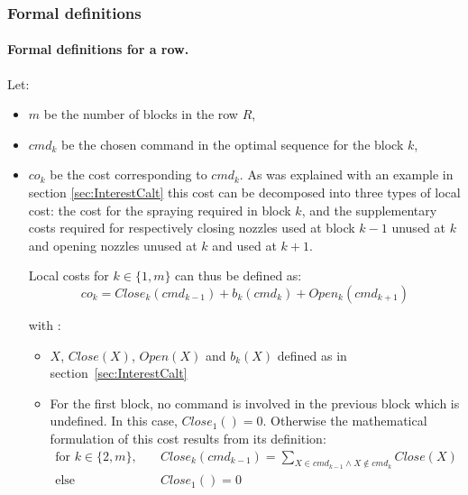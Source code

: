 \subsubsection{Formal definitions}

\paragraph{\textbf{Formal definitions for a row.}} 
Let:
\begin{itemize}
\item $m$ be the number of blocks in the row $R$,
\item $cmd_k$ be the chosen command in the optimal sequence for the block $k$,
\item $co_k$ be the cost corresponding to $cmd_k$. 
As was explained with an example in section \ref{sec:InterestCalt} %
this cost can be decomposed into three types of local cost: the cost for the spraying required in block $k$, and the supplementary costs required for respectively closing nozzles used at block $k-1$ unused at $k$ and opening nozzles unused at $k$ and used at $k+1$.

Local costs for $k \in \{1, m\}$ can thus be defined as:
\begin{equation}\label{COK}
co_k = Close_k(cmd_{k-1}) + b_k(cmd_k) + Open_k(cmd_{k+1})  
\end{equation}

with :
\begin{itemize} 
\item $X$, $Close(X)$, $Open(X)$ and $b_k(X)$ defined as in section~\ref{sec:InterestCalt}%
\item
For the first block, no command is involved in the previous block which is undefined. In this case, $Close_1()=0$. Otherwise the mathematical formulation of this cost results from its definition:
\begin{align}
\text{for } k \in \{2,m\}, &  \quad Close_k(cmd_{k-1}) = \sum\limits_{X \in cmd_{k-1} \wedge X \notin cmd_{k}} Close(X) \nonumber \\
 \text{else} & \quad Close_1()=0  \label{eq:CloseNul}
\end{align}


\end{itemize}
\end{itemize}
